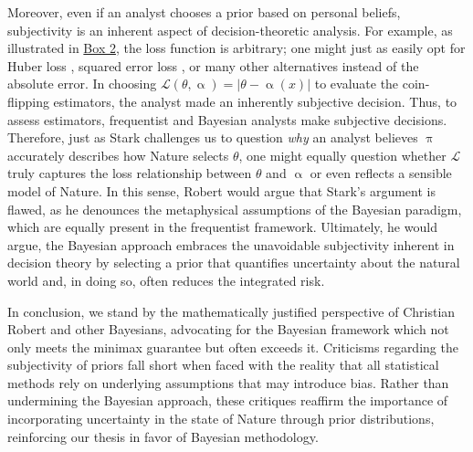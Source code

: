 \documentclass[letterpaper,12pt]{article}
\begin{document}
Moreover, even if an analyst chooses a prior based on personal beliefs, subjectivity is an inherent aspect of decision-theoretic analysis. For example, as illustrated in \hyperref[ex:1]{Box 2}, the loss function is arbitrary; one might just as easily opt for Huber loss \cite{huber1964}, squared error loss \cite{hastie2001elements}, or many other alternatives instead of the absolute error. In choosing $\mathcal{L}(\theta, \upalpha) = |\theta - \upalpha(x)|$ to evaluate the coin-flipping estimators, the analyst made an inherently subjective decision. Thus, to assess estimators, frequentist and Bayesian analysts make subjective decisions. Therefore, just as Stark challenges us to question \textit{why} an analyst believes $\uppi$ accurately describes how Nature selects $\theta$, one might equally question whether $\mathcal{L}$ truly captures the loss relationship between $\theta$ and $\upalpha$ or even reflects a sensible model of Nature. In this sense, Robert would argue that Stark’s argument is flawed, as he denounces the metaphysical assumptions of the Bayesian paradigm, which are equally present in the frequentist framework. Ultimately, he would argue, the Bayesian approach embraces the unavoidable subjectivity inherent in decision theory by selecting a prior that quantifies uncertainty about the natural world and, in doing so, often reduces the integrated risk.  

In conclusion, we stand by the mathematically justified perspective of Christian Robert and other Bayesians, advocating for the Bayesian framework which not only meets the minimax guarantee but often exceeds it. Criticisms regarding the subjectivity of priors fall short when faced with the reality that all statistical methods rely on underlying assumptions that may introduce bias. Rather than undermining the Bayesian approach, these critiques reaffirm the importance of incorporating uncertainty in the state of Nature through prior distributions, reinforcing our thesis in favor of Bayesian methodology.


  
\newpage
\end{document}
